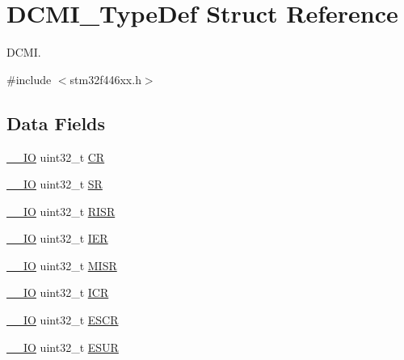 \hypertarget{struct_d_c_m_i___type_def}{}\section{D\+C\+M\+I\+\_\+\+Type\+Def Struct Reference}
\label{struct_d_c_m_i___type_def}


D\+C\+MI.  




{\ttfamily \#include $<$stm32f446xx.\+h$>$}

\subsection*{Data Fields}
\begin{DoxyCompactItemize}
\item 
\mbox{\hyperlink{core__sc300_8h_aec43007d9998a0a0e01faede4133d6be}{\+\_\+\+\_\+\+IO}} uint32\+\_\+t \mbox{\hyperlink{struct_d_c_m_i___type_def_ab40c89c59391aaa9d9a8ec011dd0907a}{CR}}
\item 
\mbox{\hyperlink{core__sc300_8h_aec43007d9998a0a0e01faede4133d6be}{\+\_\+\+\_\+\+IO}} uint32\+\_\+t \mbox{\hyperlink{struct_d_c_m_i___type_def_af6aca2bbd40c0fb6df7c3aebe224a360}{SR}}
\item 
\mbox{\hyperlink{core__sc300_8h_aec43007d9998a0a0e01faede4133d6be}{\+\_\+\+\_\+\+IO}} uint32\+\_\+t \mbox{\hyperlink{struct_d_c_m_i___type_def_aa196fddf0ba7d6e3ce29bdb04eb38b94}{R\+I\+SR}}
\item 
\mbox{\hyperlink{core__sc300_8h_aec43007d9998a0a0e01faede4133d6be}{\+\_\+\+\_\+\+IO}} uint32\+\_\+t \mbox{\hyperlink{struct_d_c_m_i___type_def_a6566f8cfbd1d8aa7e8db046aa35e77db}{I\+ER}}
\item 
\mbox{\hyperlink{core__sc300_8h_aec43007d9998a0a0e01faede4133d6be}{\+\_\+\+\_\+\+IO}} uint32\+\_\+t \mbox{\hyperlink{struct_d_c_m_i___type_def_a524e134cec519206cb41d0545e382978}{M\+I\+SR}}
\item 
\mbox{\hyperlink{core__sc300_8h_aec43007d9998a0a0e01faede4133d6be}{\+\_\+\+\_\+\+IO}} uint32\+\_\+t \mbox{\hyperlink{struct_d_c_m_i___type_def_a0a8c8230846fd8ff154b9fde8dfa0399}{I\+CR}}
\item 
\mbox{\hyperlink{core__sc300_8h_aec43007d9998a0a0e01faede4133d6be}{\+\_\+\+\_\+\+IO}} uint32\+\_\+t \mbox{\hyperlink{struct_d_c_m_i___type_def_a9cc4ec74be864c929261e0810f2fd7f0}{E\+S\+CR}}
\item 
\mbox{\hyperlink{core__sc300_8h_aec43007d9998a0a0e01faede4133d6be}{\+\_\+\+\_\+\+IO}} uint32\+\_\+t \mbox{\hyperlink{struct_d_c_m_i___type_def_af751d49ef824c1636c78822ecae066f4}{E\+S\+UR}}

\end{DoxyCompactItemize}
